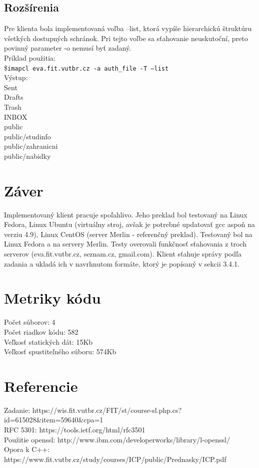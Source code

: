 \documentclass{article}
\newcommand\tab[1][1cm]{\hspace*{#1}}
\begin{document}
\subsection{Rozšírenia}
Pre klienta bola implementovaná voľba --list, ktorá vypíše hierarchickú štruktúru všetkých dostupných schránok. Pri tejto voľbe sa sťahovanie neuskutoční, preto povinný parameter -o nemusí byť zadaný.\\
Príklad použitia:\\
\$\texttt{imapcl eva.fit.vutbr.cz -a auth\_file -T --list}\\
Výstup:\\
Sent\\
Drafts\\
Trash\\
INBOX\\
public\\
    \tab public/studinfo\\
    \tab public/zahranicni\\
    \tab public/nabidky\\


\section{Záver}
Implementovaný klient pracuje spoľahlivo. Jeho preklad bol testovaný na Linux Fedora, Linux Ubuntu (virtuálny stroj, avšak je potrebné updatovať gcc aspoň na verziu 4.9), Linux CentOS (server Merlin - referenčný preklad). Testovaný bol na Linux Fedora a na servery Merlin. Testy overovali funkčnosť sťahovania z troch serverov (eva.fit.vutbr.cz, seznam.cz, gmail.com). Klient sťahuje správy podľa zadania a ukladá ich v navrhnutom formáte, ktorý je popísaný v sekcii 3.4.1.
\section{Metriky kódu}
Počet súborov:      4\\
Počet riadkov kódu: 582\\
Veľkosť statických dát: 15Kb\\
Veľkosť spustiteľného súboru:  574Kb\\

\section{Referencie}
Zadanie: https://wis.fit.vutbr.cz/FIT/st/course-sl.php.cs?id=615028\&item=59640\&cpa=1\\
RFC 5301: https://tools.ietf.org/html/rfc3501\\
Použitie openssl: http://www.ibm.com/developerworks/library/l-openssl/\\
Opora k C++: https://www.fit.vutbr.cz/study/courses/ICP/public/Prednasky/ICP.pdf\\
\end{document}
